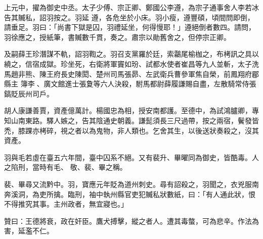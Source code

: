 \begin{pinyinscope}
 上元中，擢為御史中丞。太子少傅、宗正卿、鄭國公李遵，為宗子通事舍人李若冰告其贓私，詔羽按之。羽延
 遵，各危坐於小床。羽小瘦，遵豐碩，頃間問即倒，請垂足。羽曰：「尚書下獄是囚，羽禮延坐，何得慢耶！」遵絕倒者數四。請問，羽徐應之，授紙筆，書贓數千貫，奏之。肅宗以勛舊舍之，但停宗正卿。



 及嗣薛王珍潛謀不軌，詔羽鞫之。羽召支黨羅於廷，索鸘尾榆枷之，布栲訊之具以繞之，信宿成獄。珍坐死，右衛將軍竇如玢、試都水使者崔昌等九人並斬，太子洗馬趙非熊、陳王府長史陳閎、楚州司馬張昴、左武衛兵曹參軍焦自榮，前鳳翔府郿縣主
 簿李、廣文館進士張夐等六人決殺，駙馬都尉薛履謙賜自盡，左散騎常侍張鎬貶辰州司戶。



 胡人康謙善賈，資產億萬計。楊國忠為相，授安南都護。至德中，為試鴻臚卿，專知山南東路。驛人嫉之，告其陰通史朝義。謙髭須長三尺過帶，按之兩宿，鬢發皆禿，膝踝亦栲碎，視之者以為鬼物，非人類也。乞舍其生，以後送狀奏殺之，沒其資產。



 羽與毛若虛在臺五六年間，臺中囚系不絕。又有裴升、畢曜同為御史，皆酷毒。人之陷刑，當時有毛、
 敬、裴、畢之稱。



 裴、畢尋又流黔中。羽，寶應元年貶為道州刺史。尋有詔殺之，羽聞之，衣兇服南奔溪洞，為吏所擒。臨刑，袖中執州縣官吏犯贓私狀數紙，曰：「有人通此狀，恨不得推究其事。主州政者，無宜寢也。」



 贊曰：王德將衰，政在奸臣。鷹犬搏擊，縱之者人。遭其毒螫，可為悲辛。作法為害，延濫不仁。



\end{pinyinscope}